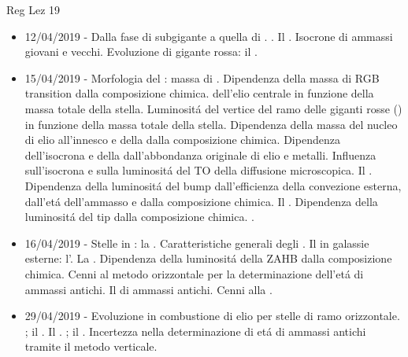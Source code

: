 \begin{frame}[allowframebreaks]{Reg Lez 19}
\begin{itemize}
\item 12/04/2019 - Dalla fase di subgigante a quella di . . Il . Isocrone di ammassi giovani e vecchi. Evoluzione di gigante rossa: il .
\item 15/04/2019 - Morfologia del : massa di . Dipendenza della massa di RGB transition dalla composizione chimica.  dell'elio centrale in funzione della massa totale della stella. Luminosit\'a del vertice del ramo delle giganti rosse () in funzione della massa totale della stella. Dipendenza della massa del nucleo di elio all'innesco e della  dalla composizione chimica. Dipendenza dell'isocrona e della  dall'abbondanza originale di elio e metalli. Influenza sull'isocrona e sulla luminosit\'a del TO della diffusione microscopica. Il . Dipendenza della luminosit\'a del bump dall'efficienza della convezione esterna, dall'et\'a dell'ammasso e dalla composizione chimica. Il . Dipendenza della luminosit\'a del tip dalla composizione chimica. .
\item 16/04/2019 - Stelle in : la . Caratteristiche generali degli . Il  in galassie esterne: l'. La . Dipendenza della luminosit\'a della ZAHB dalla composizione chimica. Cenni al metodo orizzontale per la determinazione dell'et\'a di ammassi antichi. Il  di ammassi antichi. Cenni alla .
\item 29/04/2019 - Evoluzione in combustione di elio per stelle di ramo orizzontale. ; il . Il . ; il . Incertezza nella determinazione di et\'a di ammassi antichi tramite il metodo verticale.

\end{itemize}
\end{frame}
